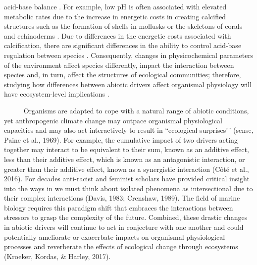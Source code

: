 \documentclass[
  12pt,
]{article}
\begin{document}
acid-base balance \citep{gaylord2015ocean}. For example, low pH is often
associated with elevated metabolic rates due to the increase in
energetic costs in creating calcified structures such as the formation
of shells in mollusks or the skeletons of corals and echinoderms
\citep{doney2009ocean, spalding2017energetic}. Due to differences in the
energetic costs associated with calcification, there are significant
differences in the ability to control acid-base regulation between
species \citep{doney2009ocean}. Consequently, changes in physicochemical
parameters of the environment affect species differently, impact the
interaction between species and, in turn, affect the structures of
ecological communities; therefore, studying how differences between
abiotic drivers affect organismal physiology will have ecosystem-level
implications \citep{tomanek2002physiological, barclay2019variation}.

~~~~~ Organisms are adapted to cope with a natural range of abiotic
conditions, yet anthropogenic climate change may outpace organismal
physiological capacities and may also act interactively to result in
``ecological surprises'\,' (sense, Paine et al., 1969). For example, the
cumulative impact of two drivers acting together may interact to be
equivalent to their sum, known as an additive effect, less than their
additive effect, which is known as an antagonistic interaction, or
greater than their additive effect, known as a synergistic interaction
(Côté et al., 2016). For decades anti-racist and feminist scholars have
provided critical insight into the ways in we must think about isolated
phenomena as intersectional due to their complex interactions (Davis,
1983; Crenshaw, 1989). The field of marine biology requires this
paradigm shift that embraces the interactions between stressors to grasp
the complexity of the future. Combined, these drastic changes in abiotic
drivers will continue to act in conjecture with one another and could
potentially ameliorate or exacerbate impacts on organismal physiological
processes and reverberate the effects of ecological change through
ecosystems (Kroeker, Kordas, \& Harley, 2017).

\newpage
\end{document}
